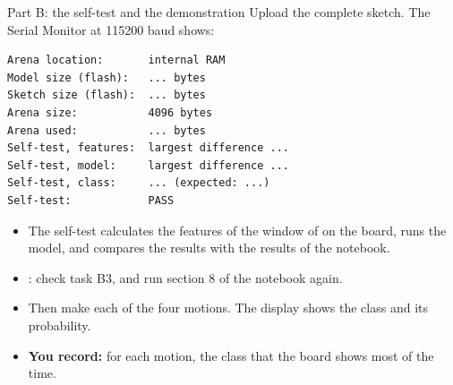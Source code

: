 \begin{frame}[fragile]{Part B: the self-test and the demonstration}
  \small
  Upload the complete sketch. The Serial Monitor at 115200 baud shows:
\begin{lstlisting}
Arena location:       internal RAM
Model size (flash):   ... bytes
Sketch size (flash):  ... bytes
Arena size:           4096 bytes
Arena used:           ... bytes
Self-test, features:  largest difference ...
Self-test, model:     largest difference ...
Self-test, class:     ... (expected: ...)
Self-test:            PASS
\end{lstlisting}
  \begin{itemize}
    \item The self-test calculates the features of the window of
           on the board, runs the model, and compares
          the results with the results of the notebook.
    \item {}: check task B3, and run section 8 of the notebook
          again.
    \item Then make each of the four motions. The display shows the class
          and its probability.
    \item \textbf{You record:} for each motion, the class that the board
          shows most of the time.
  \end{itemize}
\end{frame}

